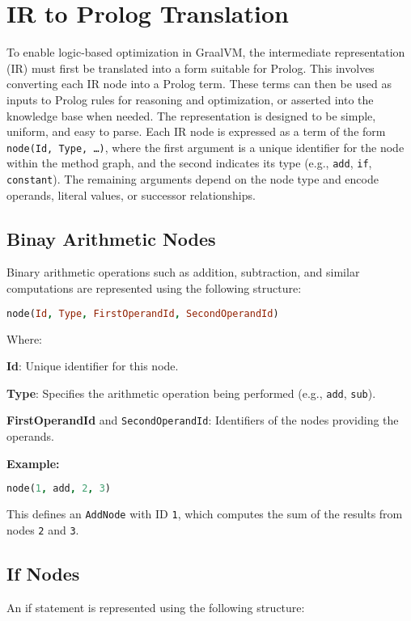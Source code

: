 \section{IR to Prolog Translation}
\label{sec:generate-facts}
To enable logic-based optimization in GraalVM, the intermediate representation (IR) must first be translated into a form suitable for Prolog. This involves converting each IR node into a Prolog term. These terms can then be used as inputs to Prolog rules for reasoning and optimization, or asserted into the knowledge base when needed.
The representation is designed to be simple, uniform, and easy to parse. Each IR node is expressed as a term of the form \texttt{node(Id, Type, \ldots)}, where the first argument is a unique identifier for the node within the method graph, and the second indicates its type (e.g., \texttt{add}, \texttt{if}, \texttt{constant}). The remaining arguments depend on the node type and encode operands, literal values, or successor relationships.

\subsection*{Binay Arithmetic Nodes}
Binary arithmetic operations such as addition, subtraction, and similar computations are represented using the following structure:

\begin{lstlisting}[language=Prolog]
node(Id, Type, FirstOperandId, SecondOperandId)
\end{lstlisting}

Where:
\begin{description}
    \item \textbf{Id}: Unique identifier for this node.
    \item \textbf{Type}:  Specifies the arithmetic operation being performed (e.g., \texttt{add}, \texttt{sub}).
    \item \textbf{FirstOperandId} and \texttt{SecondOperandId}: Identifiers of the nodes providing the operands.
\end{description}

\textbf{Example:}
\begin{lstlisting}[language=Prolog]
node(1, add, 2, 3)
\end{lstlisting}
This defines an \texttt{AddNode} with ID \texttt{1}, which computes the sum of the results from nodes \texttt{2} and \texttt{3}.


\subsection*{If Nodes}
An if statement is represented using the following structure:

